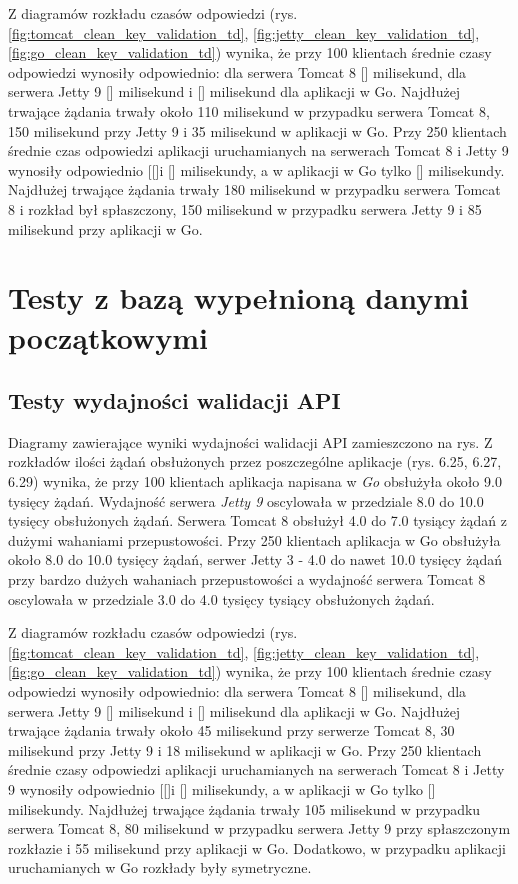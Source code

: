 Z diagramów rozkładu czasów odpowiedzi (rys. \ref{fig:tomcat_clean_key_validation_td}, \ref{fig:jetty_clean_key_validation_td}, \ref{fig:go_clean_key_validation_td}) wynika, że przy 100 klientach średnie czasy odpowiedzi wynosiły odpowiednio: dla serwera Tomcat 8 [] milisekund, dla serwera Jetty 9 [] milisekund i [] milisekund dla aplikacji w Go.  Najdłużej trwające żądania trwały około 110 milisekund w przypadku serwera Tomcat 8, 150 milisekund przy Jetty 9 i 35 milisekund  w aplikacji w Go. Przy 250 klientach średnie czas odpowiedzi aplikacji uruchamianych na serwerach Tomcat 8 i Jetty 9  wynosiły  odpowiednio [[]i [] milisekundy, a w aplikacji w Go tylko [] milisekundy. Najdłużej trwające żądania trwały 180 milisekund w przypadku serwera Tomcat 8 i rozkład był spłaszczony, 150 milisekund w przypadku serwera Jetty 9 i 85 milisekund przy aplikacji w Go. 


\clearpage

\newpage
\section{Testy z bazą wypełnioną danymi początkowymi}
\subsection{Testy wydajności walidacji API}
Diagramy zawierające wyniki wydajności walidacji API zamieszczono na rys.
Z rozkładów ilości żądań obsłużonych przez poszczególne aplikacje (rys. 6.25, 6.27, 6.29) wynika, że przy 100 klientach aplikacja napisana w \textsl{Go} obsłużyła około 9.0 tysięcy żądań. Wydajność serwera  \textsl{Jetty 9} oscylowała w przedziale 8.0 do 10.0 tysięcy obsłużonych żądań. Serwera Tomcat 8  obsłużył  4.0 do 7.0 tysiący żądań z dużymi wahaniami przepustowości. Przy 250 klientach aplikacja w Go obsłużyła około 8.0 do 10.0 tysięcy żądań, serwer Jetty 3 - 4.0 do nawet 10.0 tysięcy żądań przy bardzo dużych wahaniach przepustowości a wydajność serwera Tomcat 8 oscylowała w przedziale 3.0 do 4.0 tysięcy tysiący obsłużonych żądań. 
 
Z diagramów rozkładu czasów odpowiedzi (rys. \ref{fig:tomcat_clean_key_validation_td}, \ref{fig:jetty_clean_key_validation_td}, \ref{fig:go_clean_key_validation_td}) wynika, że przy 100 klientach średnie czasy odpowiedzi wynosiły odpowiednio: dla serwera Tomcat 8 [] milisekund, dla serwera Jetty 9 [] milisekund i [] milisekund dla aplikacji w Go.  Najdłużej trwające żądania trwały około 45 milisekund przy serwerze Tomcat 8, 30 milisekund przy Jetty 9 i 18 milisekund  w aplikacji w Go. Przy 250 klientach średnie czasy odpowiedzi aplikacji uruchamianych na serwerach Tomcat 8 i Jetty 9  wynosiły odpowiednio [[]i [] milisekundy, a w aplikacji w Go tylko [] milisekundy. Najdłużej trwające żądania trwały 105 milisekund w przypadku serwera Tomcat 8, 80 milisekund w przypadku serwera Jetty 9 przy spłaszczonym rozkłazie i 55 milisekund przy aplikacji w Go. Dodatkowo, w przypadku aplikacji uruchamianych w Go rozkłady były symetryczne.

\clearpage

